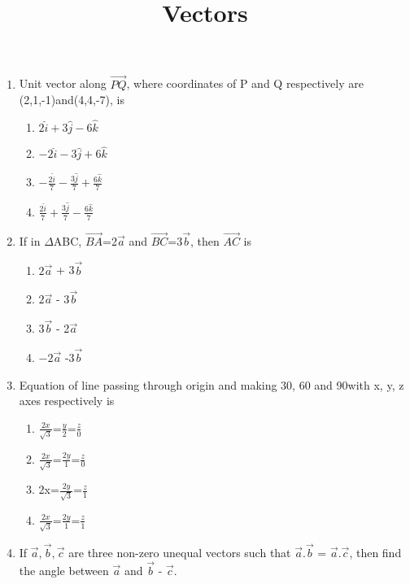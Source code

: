 \documentclass{article}
\title{\textbf{Vectors}}
\date{}
\begin{document}
\maketitle

\begin{enumerate}
\item Unit vector along $\overrightarrow{PQ}$, where coordinates of P and Q respectively are (2,1,-1)and(4,4,-7), is
\begin{enumerate}
\item $2\hat{i}+3\hat{j}-6\hat{k}$
\item $-2\hat{i}-3\hat{j}+6\hat{k}$
\item $-\frac{2\hat{i}}{7}-\frac{3\hat{j}}{7}+\frac{6\hat{k}}{7}$
\item $\frac{2\hat{i}}{7}+\frac{3\hat{j}}{7}-\frac{6\hat{k}}{7}$
\end{enumerate}

\item If in $\Delta$ABC, $\overrightarrow{BA}$=2$\overrightarrow{a}$ and $\overrightarrow{BC}$=3$\overrightarrow{b}$, then $\overrightarrow{AC}$ is
\begin{enumerate}
\item $2\overrightarrow{a}$ + 3$\overrightarrow{b}$
\item $2\overrightarrow{a}$ - 3$\overrightarrow{b}$
\item $3\overrightarrow{b}$ - 2$\overrightarrow{a}$
\item $-2\overrightarrow{a}$ -3$\overrightarrow{b}$
\end{enumerate}

\item Equation of line passing through origin and making 30\degree{}, 60\degree{} and 90\degree with x, y, z axes respectively is
\begin{enumerate}
\item $\frac{2x}{\sqrt{3}}$=$\frac{y}{2}$=$\frac{z}{0}$
\item $\frac{2x}{\sqrt{3}}$=$\frac{2y}{1}$=$\frac{z}{0}$
\item 2x=$\frac{2y}{\sqrt{3}}$=$\frac{z}{1}$
\item $\frac{2x}{\sqrt{3}}$=$\frac{2y}{1}$=$\frac{z}{1}$
\end{enumerate}

\item If $\overrightarrow{a}, \overrightarrow{b}, \overrightarrow{c}$ are three non-zero unequal vectors such that $\overrightarrow{a}.\overrightarrow{b}$ = $\overrightarrow{a}.\overrightarrow{c}$, then find the angle between $\overrightarrow{a}$ and $\overrightarrow{b}$ - $\overrightarrow{c}$.



\end{enumerate}
\end{document}
